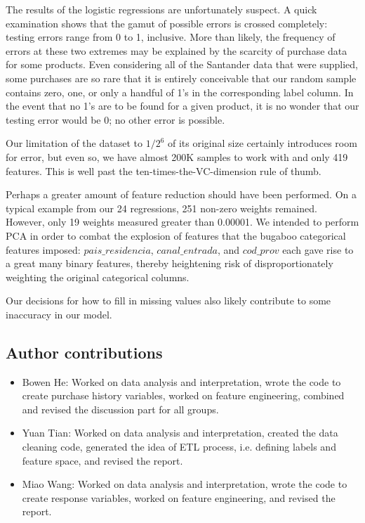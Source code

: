 \documentclass{article}
\begin{document}
\begin{spacing}{1}
\begin{large}
The results of the logistic regressions are unfortunately suspect. A quick examination shows that the gamut of possible errors is crossed completely: testing errors range from 0 to 1, inclusive. More than likely, the frequency of errors at these two extremes may be explained by the scarcity of purchase data for some products. Even considering all of the Santander data that were supplied, some purchases are so rare that it is entirely conceivable that our random sample contains zero, one, or only a handful of 1's in the corresponding label column. In the event that no 1's are to be found for a given product, it is no wonder that our testing error would be 0; no other error is possible.

Our limitation of the dataset to $1/2^6$ of its original size certainly introduces room for error, but even so, we have almost 200K samples to work with and only 419 features. This is well past the ten-times-the-VC-dimension rule of thumb.\cite{amlbook}

Perhaps a greater amount of feature reduction should have been performed. On a typical example from our 24 regressions, 251 non-zero weights remained. However, only 19 weights measured greater than 0.00001. We intended to perform PCA in order to combat the explosion of features that the bugaboo categorical features imposed: $pais\_residencia$, $canal\_entrada$, and $cod\_prov$ each gave rise to a great many binary features, thereby heightening risk of disproportionately weighting the original categorical columns.

Our decisions for how to fill in missing values also likely contribute to some inaccuracy in our model.

\subsection{Author contributions}
\begin{itemize}
	\item Bowen He:  Worked on data analysis and interpretation, wrote the code to create purchase history variables, worked on feature engineering, combined and revised the discussion part for all groups.

	\item Yuan Tian:  Worked on data analysis and interpretation, created the data cleaning code, generated the idea of ETL process, i.e. defining labels and feature space, and revised the report.

	\item Miao Wang:  Worked on data analysis and interpretation, wrote the code to create response variables, worked on feature engineering, and revised the report.


\end{itemize}
\end{large}
\end{spacing}
\end{document}
